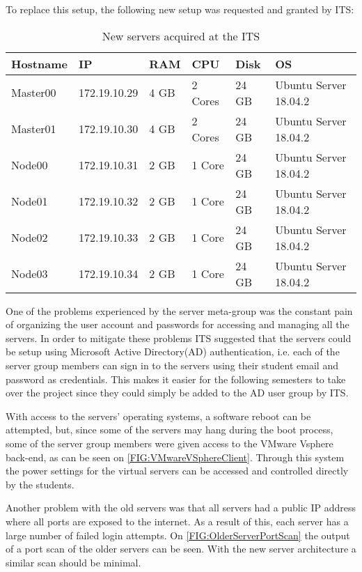 To replace this setup, the following new setup was requested and granted by ITS:

\begin{table}[H]
\begin{tabular}{|l|l|l|l|l|l|}
\hline
Hostname 	& IP			& RAM 	& CPU 		& Disk 		& OS 						\\ \hline
Master00 	& 172.19.10.29	& 4 GB	& 2 Cores	& 24 GB		& Ubuntu Server 18.04.2		\\ \hline
Master01 	& 172.19.10.30	& 4 GB	& 2 Cores	& 24 GB		& Ubuntu Server 18.04.2		\\ \hline
Node00 		& 172.19.10.31	& 2 GB	& 1 Core	& 24 GB		& Ubuntu Server 18.04.2		\\ \hline
Node01 		& 172.19.10.32	& 2 GB	& 1 Core	& 24 GB		& Ubuntu Server 18.04.2		\\ \hline
Node02 		& 172.19.10.33	& 2 GB	& 1 Core	& 24 GB		& Ubuntu Server 18.04.2		\\ \hline
Node03 		& 172.19.10.34	& 2 GB	& 1 Core	& 24 GB		& Ubuntu Server 18.04.2		\\ \hline
\end{tabular}
\caption{New servers acquired at the ITS}
\end{table}

One of the problems experienced by the server meta-group was the constant pain of organizing the user account and passwords for accessing and managing all the servers.
In order to mitigate these problems ITS suggested that the servers could be setup using Microsoft Active Directory(AD) authentication, i.e. each of the server group members can sign in to the servers using their student email and password as credentials.
This makes it easier for the following semesters to take over the project since they could simply be added to the AD user group by ITS.

With access to the servers' operating systems, a software reboot can be attempted, but, since some of the servers may hang during the boot process, some of the server group members were given access to the VMware Vsphere back-end, as can be seen on \autoref{FIG:VMwareVSphereClient}.
Through this system the power settings for the virtual servers can be accessed and controlled directly by the students.

Another problem with the old servers was that all servers had a public IP address where all ports are exposed to the internet.
As a result of this, each server has a large number of failed login attempts.
On \autoref{FIG:OlderServerPortScan} the output of a port scan of the older servers can be seen.
With the new server architecture a similar scan should be minimal.

